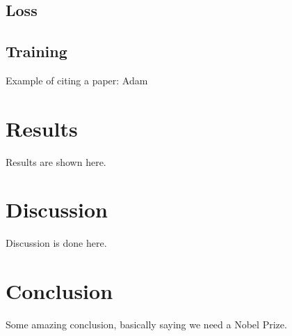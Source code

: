 \documentclass[10pt,conference,compsocconf]{IEEEtran}
\begin{document}
\subsection{Loss}

\subsection{Training}
Example of citing a paper: Adam~\citep{kingma2014adam}

\subsection{}

\section{Results}
Results are shown here.

\section{Discussion}
Discussion is done here.

\section{Conclusion}
Some amazing conclusion, basically saying we need a Nobel Prize.




\end{document}
